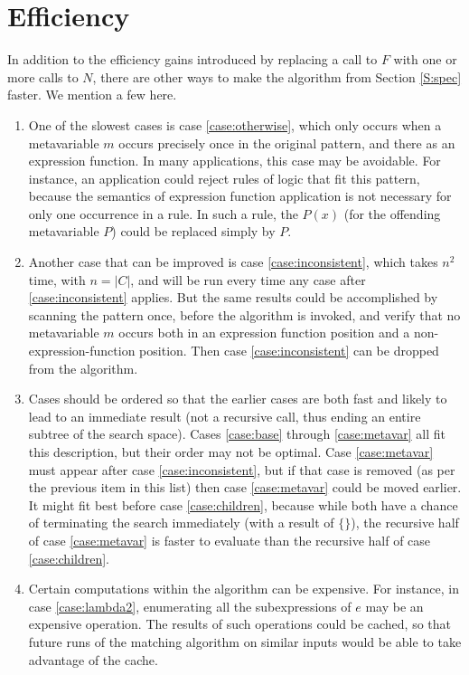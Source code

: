 \documentclass{article}
\begin{document}
\section{Efficiency}%

In addition to the efficiency gains introduced by replacing a call to $F$ with one or more calls to $N$, there are other ways to make the algorithm from Section \ref{S:spec} faster.  We mention a few here.

\begin{enumerate}
\item	One of the slowest cases is case \ref{case:otherwise}, which only occurs when a metavariable $m$ occurs precisely once in the original pattern, and there as an expression function.  In many applications, this case may be avoidable.  For instance, an application could reject rules of logic that fit this pattern, because the semantics of expression function application is not necessary for only one occurrence in a rule.  In such a rule, the $P(x)$ (for the offending metavariable $P$) could be replaced simply by $P$.
\item	Another case that can be improved is case \ref{case:inconsistent}, which takes $n^2$ time, with $n=|C|$, and will be run every time any case after \ref{case:inconsistent} applies.  But the same results could be accomplished by scanning the pattern once, before the algorithm is invoked, and verify that no metavariable $m$ occurs both in an expression function position and a non-expression-function position.  Then case \ref{case:inconsistent} can be dropped from the algorithm.
\item	Cases should be ordered so that the earlier cases are both fast and likely to lead to an immediate result (not a recursive call, thus ending an entire subtree of the search space).  Cases \ref{case:base} through \ref{case:metavar} all fit this description, but their order may not be optimal.  Case \ref{case:metavar} must appear after case \ref{case:inconsistent}, but if that case is removed (as per the previous item in this list) then case \ref{case:metavar} could be moved earlier.  It might fit best before case \ref{case:children}, because while both have a chance of terminating the search immediately (with a result of $\{\}$), the recursive half of case \ref{case:metavar} is faster to evaluate than the recursive half of case \ref{case:children}.
\item	Certain computations within the algorithm can be expensive.  For instance, in case \ref{case:lambda2}, enumerating all the subexpressions of $e$ may be an expensive operation.  The results of such operations could be cached, so that future runs of the matching algorithm on similar inputs would be able to take advantage of the cache.

\end{enumerate}
\end{document}
